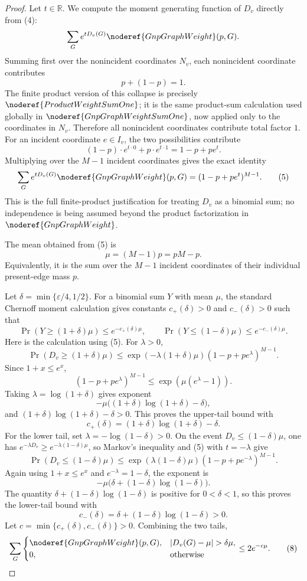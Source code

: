\begin{proof}
Let \(t\in\mathbb R\).  We compute the moment generating function of
\(D_v\) directly from (4):
\[
\sum_G e^{tD_v(G)}\noderef{GnpGraphWeight}(p,G).
\]
Summing first over the nonincident coordinates \(N_v\), each nonincident
coordinate contributes
\[
p+(1-p)=1.
\]
The finite product version of this collapse is precisely
\(\noderef{ProductWeightSumOne}\); it is the same product-sum calculation
used globally in \(\noderef{GnpGraphWeightSumOne}\), now applied only to the
coordinates in \(N_v\).  Therefore all nonincident coordinates contribute
total factor \(1\).  For an incident coordinate \(e\in I_v\), the two
possibilities contribute
\[
(1-p)\cdot e^{t\cdot0}+p\cdot e^{t\cdot1}=1-p+pe^t.
\]
Multiplying over the \(M-1\) incident coordinates gives the exact identity
\[
\sum_G e^{tD_v(G)}\noderef{GnpGraphWeight}(p,G)
=(1-p+pe^t)^{M-1}.
\tag{5}
\]
This is the full finite-product justification for treating \(D_v\) as a
binomial sum; no independence is being assumed beyond the product
factorization in \(\noderef{GnpGraphWeight}\).

The mean obtained from (5) is
\[
\mu=(M-1)p=pM-p.
\tag{6}
\]
Equivalently, it is the sum over the \(M-1\) incident coordinates of their
individual present-edge mass \(p\).

Let \(\delta=\min\{\varepsilon/4,1/2\}\).  For a binomial sum \(Y\) with mean
\(\mu\), the standard Chernoff moment calculation gives constants
\(c_+(\delta)>0\) and \(c_-(\delta)>0\) such that
\[
\Pr(Y\ge (1+\delta)\mu)\le e^{-c_+(\delta)\mu},
\qquad
\Pr(Y\le (1-\delta)\mu)\le e^{-c_-(\delta)\mu}.
\tag{7}
\]
Here is the calculation using (5).  For \(\lambda>0\),
\[
\Pr(D_v\ge(1+\delta)\mu)
\le
\exp(-\lambda(1+\delta)\mu)
(1-p+pe^\lambda)^{M-1}.
\]
Since \(1+x\le e^x\),
\[
(1-p+pe^\lambda)^{M-1}
\le\exp(\mu(e^\lambda-1)).
\]
Taking \(\lambda=\log(1+\delta)\) gives exponent
\[
-\mu\bigl((1+\delta)\log(1+\delta)-\delta\bigr),
\]
and \((1+\delta)\log(1+\delta)-\delta>0\).  This proves the upper-tail
bound with
\[
c_+(\delta)=(1+\delta)\log(1+\delta)-\delta.
\]
For the lower tail, set \(\lambda=-\log(1-\delta)>0\).  On the event
\(D_v\le(1-\delta)\mu\), one has
\(e^{-\lambda D_v}\ge e^{-\lambda(1-\delta)\mu}\), so Markov's inequality
and (5) with \(t=-\lambda\) give
\[
\Pr(D_v\le(1-\delta)\mu)
\le
\exp(\lambda(1-\delta)\mu)
(1-p+pe^{-\lambda})^{M-1}.
\]
Again using \(1+x\le e^x\) and \(e^{-\lambda}=1-\delta\), the exponent is
\[
-\mu\bigl(\delta+(1-\delta)\log(1-\delta)\bigr).
\]
The quantity \(\delta+(1-\delta)\log(1-\delta)\) is positive for
\(0<\delta<1\), so this proves the lower-tail bound with
\[
c_-(\delta)=\delta+(1-\delta)\log(1-\delta)>0.
\]
Let \(c=\min\{c_+(\delta),c_-(\delta)\}>0\).  Combining the two tails,
\[
\sum_G
\begin{cases}
\noderef{GnpGraphWeight}(p,G),
& |D_v(G)-\mu|>\delta\mu,\\
0,&\text{otherwise}
\end{cases}
\le 2e^{-c\mu}.
\tag{8}
\]


\end{proof}
